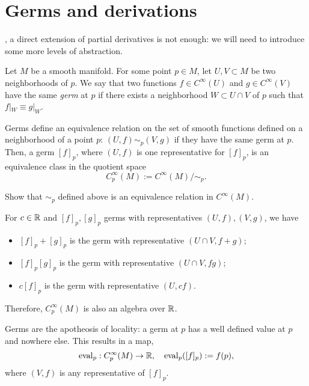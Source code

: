 \section{Germs and derivations}

, a direct extension of partial derivatives is not enough: we will need to introduce some more levels of abstraction.

\begin{defn}
    Let $M$ be a smooth manifold.
    For some point $p\in M$, let $U,V\subset M$ be two neighborhoods of $p$.
    We say that two functions $f\in C^\infty(U)$ and $g\in C^\infty(V)$ have the same \emph{germ} at $p$ if there exists a neighborhood $W\subset U\cap V$ of $p$ such that $f|_W \equiv g|_W$.
\end{defn}

Germs define an equivalence relation on the set of smooth functions defined on a neighborhood of a point $p$: $(U, f) \sim_p (V, g)$ if they have the same germ at $p$. Then, a germ $[f]_p$, where $(U, f)$ is one representative for $[f]_p$, is an equivalence class in the quotient space 
\begin{equation}
    C_p^\infty(M) := C^\infty(M)/\sim_p.
\end{equation} 

\begin{exe}
    Show that $\sim_p$ defined above is an equivalence relation in $C^\infty(M)$.
\end{exe}

For $c\in\mathbb{R}$ and $[f]_p, [g]_p$ germs with representatives $(U, f), (V, g)$, we have
\begin{itemize}
    \item $[f]_p + [g]_p$ is the germ with representative $(U\cap V, f+g)$;
    \item $[f]_p [g]_p$ is the germ with representative $(U\cap V, f g)$;
    \item $c[f]_p$ is the germ with representative $(U, cf)$.
\end{itemize}
Therefore, $C_p^\infty(M)$ is also an algebra over $\mathbb{R}$.

Germs are the apotheosis of locality: a germ at $p$ has a well defined value at $p$ and nowhere else.
This results in a map,
\begin{equation}
    \operatorname{eval}_p: C_p^\infty(M) \to \mathbb{R}, \quad
    \operatorname{eval}_p([f]_p) := f(p),
\end{equation}
where $(V,f)$ is any representative of $[f]_p$.

